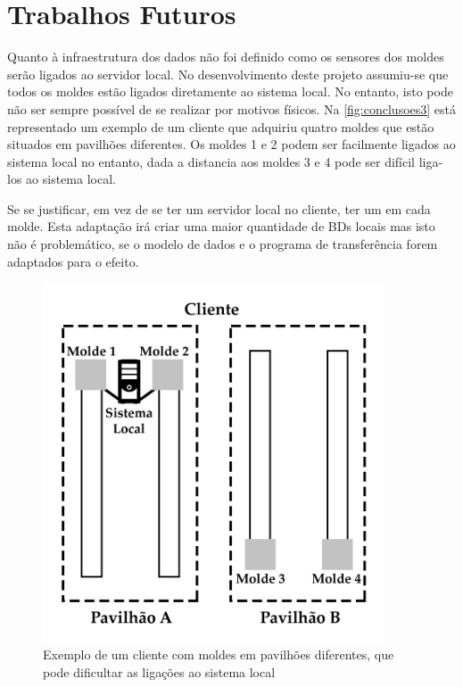 \documentclass[11pt,twoside,a4paper]{report}
\begin{document}
\section{Trabalhos Futuros}
Quanto à infraestrutura dos dados não foi definido como os sensores dos moldes serão ligados ao servidor local. No desenvolvimento deste projeto assumiu-se que todos os moldes estão ligados diretamente ao sistema local. No entanto, isto pode não ser sempre possível de se realizar por motivos físicos. Na \autoref{fig:conclusoes3} está representado um exemplo de um cliente que adquiriu quatro moldes que estão situados em pavilhões diferentes. Os moldes 1 e 2 podem ser facilmente ligados ao sistema local no entanto, dada a distancia aos moldes 3 e 4 pode ser difícil liga-los ao sistema local.\par 
Se se justificar, em vez de se ter um servidor local no cliente, ter um em cada molde. Esta adaptação irá criar uma maior quantidade de BDs locais mas isto não é problemático, se o modelo de dados e o programa de transferência forem adaptados para o efeito.\par
\begin{figure}[H]
	\begin{center}
		\includegraphics[width=0.9\textwidth]{exemplo_pavilhoes} %
		\caption[Exemplo de um cliente com moldes em pavilhões diferentes]{Exemplo de um cliente com moldes em pavilhões diferentes, que pode dificultar as ligações ao sistema local}
		\label{fig:conclusoes3}
	\end{center}
\end{figure}
\end{document}
